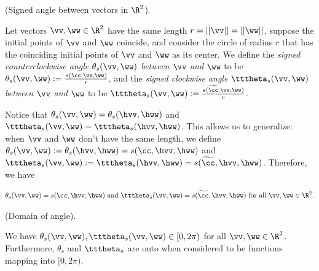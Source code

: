 \begin{defn}
\label{ch::lin_alg::defn::angle_in_R2}
    (Signed angle between vectors in $\R^2$).
    
    Let vectors $\vv, \ww \in \R^2$ have the same length $r = ||\vv|| = ||\ww||$, suppose the initial points of $\vv$ and $\ww$ coincide, and consider the circle of radius $r$ that has the coinciding initial points of $\vv$ and $\ww$ as its center. We define the \textit{signed counterclockwise angle $\theta_s(\vv, \ww)$ between $\vv$ and $\ww$} to be $\theta_s(\vv, \ww) := \frac{s(\cc, \vv, \ww)}{r}$, and the \textit{signed clockwise angle
    $\tttheta_s(\vv, \ww)$ between $\vv$ and $\ww$} to be $\tttheta_s(\vv, \ww) := \frac{s(\widetilde{\cc}, \vv, \ww)}{r}$. 
    
    Notice that $\theta_s(\vv, \ww) = \theta_s(\hvv, \hww)$ and $\tttheta_s(\vv, \ww) = \tttheta_s(\hvv, \hww)$. This allows us to generalize: when $\vv$ and $\ww$ don't have the same length, we define $\theta_s(\vv, \ww) := \theta_s(\hvv, \hww) = s(\cc, \hvv, \hww)$ and $\tttheta_s(\vv, \ww) := \tttheta_s(\hvv, \hww) = s(\widetilde{\cc}, \hvv, \hww)$. Therefore, we have

    \begin{align*}
        \theta_s(\vv, \ww) = s(\cc, \hvv, \hww) \text{ and }
        \tttheta_s(\vv, \ww) = s(\widetilde{\cc}, \hvv, \hww) \text{ for all $\vv, \ww \in \R^2$}.
    \end{align*}
\end{defn}

\begin{theorem}
    (Domain of angle).

    We have $\theta_s(\vv, \ww), \tttheta_s(\vv, \ww) \in [0, 2\pi)$ for all $\vv, \ww \in \R^2$. Furthermore, $\theta_s$ and $\tttheta_s$ are onto when considered to be functions mapping into $[0, 2\pi)$.
\end{theorem}


